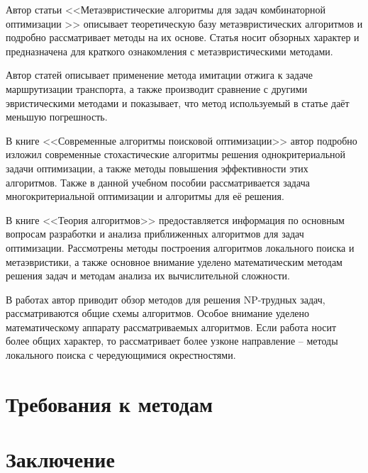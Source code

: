 Автор статьи <<Метаэвристические алгоритмы для задач комбинаторной оптимизации >>\cite{bib:48} описывает 
теоретическую базу метаэвристических алгоритмов и подробно рассматривает методы на их основе. Статья носит 
обзорных характер и предназначена для краткого ознакомления с метаэвристическими методами.

Автор статей \cite{bib:50,bib:51} описывает применение метода имитации отжига к задаче маршрутизации 
транспорта, а также производит сравнение с другими эвристическими методами и показывает, что метод 
используемый в статье даёт меньшую погрешность.

В книге <<Современные алгоритмы поисковой оптимизации>>\cite{bib:52} автор подробно изложил современные 
стохастические алгоритмы решения однокритериальной задачи оптимизации, а также методы повышения 
эффективности этих алгоритмов. Также в данной учебном пособии рассматривается задача многокритериальной 
оптимизации и алгоритмы для её решения.

В книге <<Теория алгоритмов>>\cite{bib:53} предоставляется информация по основным вопросам разработки и 
анализа приближенных алгоритмов для задач оптимизации. Рассмотрены методы построения алгоритмов 
локального поиска и метаэвристики, а также основное внимание уделено математическим методам решения задач 
и методам анализа их вычислительной сложности.

В работах \cite{bib:54,bib:57} автор приводит обзор методов для решения NP-трудных задач, рассматриваются 
общие схемы алгоритмов. Особое внимание уделено математическому аппарату рассматриваемых алгоритмов. 
Если работа \cite{bib:54} носит более общих характер, то \cite{bib:57} рассматривает более узконе 
направление -- методы локального поиска с чередующимися окрестностями.


\section{Требования к методам}
\section{Заключение}